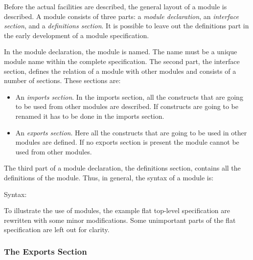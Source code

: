 \documentclass[\pformat,12pt]{article}
\begin{document}
Before the actual facilities are described, the general layout of a
module is described. A module consists of three parts: a {\it module
declaration}, an {\it interface section}, and a {\it definitions
section}. It is possible to leave out the definitions part in the
early development of a module specification.

In the module declaration, the module is named. The name must be a
unique module name within the complete specification. The second
part, the interface section, defines the relation of a module with other
modules and consists of a number of sections. These sections are:
\begin{itemize}

\item An {\it imports section}. In the imports section, all the
  constructs that are going to be used from other modules are
  described. If constructs are going to be renamed it has to be done
  in the imports section. 

\item An {\it exports section}. Here all the constructs that are going
  to be used in other modules are defined.
  If no exports section is present the
  module cannot be used from other modules.
\end{itemize}
The third part of a module declaration, the
definitions section, contains all the definitions of the module.
Thus, in general, the syntax of a module is:


\begin{description}
\item[Syntax:]

\end{description}

To illustrate the use of modules, the example flat top-level
specification are rewritten with some minor modifications.  Some
unimportant parts of the flat specification are left out for clarity.

\subsubsection{The Exports Section}
\end{document}
